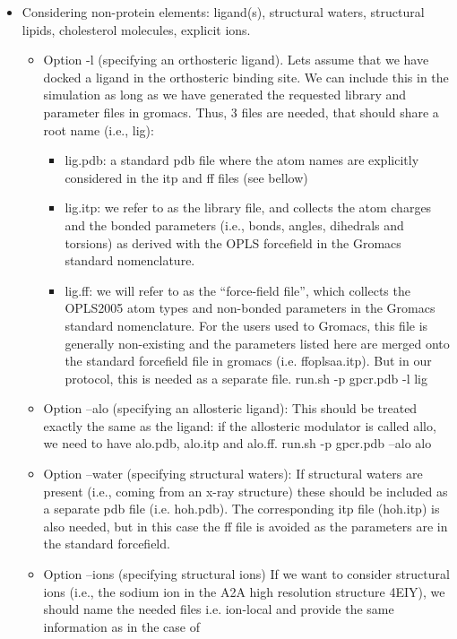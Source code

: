 \documentclass[10pt, oneside, pdftex]{article}
\begin{document}
\begin{itemize}
\item{Considering  non-protein  elements:  ligand(s),  structural  waters,
  structural lipids, cholesterol molecules, explicit ions.}
\begin{itemize}
\item{Option  -l (specifying an  orthosteric ligand). Lets assume  that we
have docked a  ligand in the orthosteric binding  site. We can include
this  in the simulation  as long  as we  have generated  the requested
library and parameter files in gromacs. Thus, 3 files are needed, that
should share a root name (i.e., lig):}
\begin{itemize}
\item{lig.pdb:  a standard  pdb file  where  the atom  names are  explicitly
considered in the  itp and ff files (see bellow)}
\item{lig.itp: we refer to
as  the library file,  and collects  the atom  charges and  the bonded
parameters (i.e.,  bonds, angles,  dihedrals and torsions)  as derived
with  the  OPLS  forcefield  in  the  Gromacs  standard  nomenclature.}
\item{lig.ff: we will refer to as the ``force-field file'', which collects the
OPLS2005 atom types and  non-bonded parameters in the Gromacs standard
nomenclature. For  the users used  to Gromacs, this file  is generally
non-existing  and  the parameters  listed  here  are  merged onto  the
standard forcefield  file in gromacs  (i.e. ffoplsaa.itp). But  in our
protocol, this  is needed as a  separate file.}
run.sh  -p gpcr.pdb -l lig
\end{itemize}
\item{Option --alo  (specifying an allosteric ligand):  This should be
  treated exactly the same as  the ligand: if the allosteric modulator
  is  called allo,  we  need  to have  alo.pdb,  alo.itp and  alo.ff.}
  run.sh -p gpcr.pdb --alo alo 
\item{Option --water (specifying structural
  waters):  If structural  waters are  present (i.e.,  coming  from an
  x-ray structure)  these should  be included as  a separate  pdb file
  (i.e. hoh.pdb). The corresponding itp file (hoh.itp) is also needed,
  but in this case the ff file is avoided as the parameters are in the
  standard forcefield.}   
\item{Option --ions  (specifying structural ions)
  If we want to consider structural  ions (i.e., the sodium ion in the
  A2A high resolution structure 4EIY), we should name the needed files
  i.e. ion-local  and provide the same  information as in  the case of
}
\end{itemize}
\end{itemize}
\end{document}

